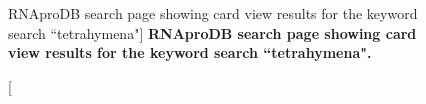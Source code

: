 \begin{center}
    \begin{figure}[H]
        \caption[RNAproDB search page showing card view results for the keyword search ``tetrahymena"]{\textbf{ RNAproDB search page showing card view results for the keyword search ``tetrahymena".}}
  \label{fig:rnaprodbS1}
\end{figure}
\end{center}

